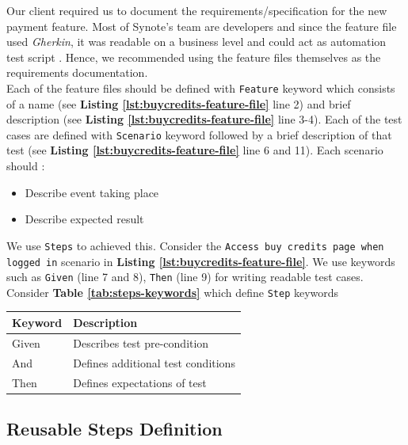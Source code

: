Our client required us to document the requirements/specification for the new payment feature. Most of Synote's team are developers and since the feature file used \textit{Gherkin}, it was readable on a business level and could act as automation test script \cite{featurefile1}. Hence, we recommended using the feature files themselves as the requirements documentation.\\

Each of the feature files should be defined with \texttt{Feature} keyword which consists of a name  (see \textbf{Listing \ref{lst:buycredits-feature-file}} line  2) and brief description  (see \textbf{Listing \ref{lst:buycredits-feature-file}} line  3-4). Each of the test cases are defined with \texttt{Scenario} keyword followed by a brief description of that test (see \textbf{Listing \ref{lst:buycredits-feature-file}} line  6 and 11). Each scenario should \cite{featurefile3}:
\begin{itemize}
\item Describe event taking place
\item Describe expected result
\end{itemize}

We use \texttt{Steps} to achieved this. Consider the \texttt{Access buy credits page when logged in} scenario in \textbf{Listing \ref{lst:buycredits-feature-file}}. We use keywords such as \texttt{Given} (line 7 and 8), \texttt{Then} (line 9) for writing readable test cases. Consider \textbf{Table \ref{tab:steps-keywords}} which define \texttt{Step} keywords \cite{featurefile1}

\begin{center}
\begin{tabular}{ |p{2cm}|p{7cm}| }

 \hline
 	Keyword &
 	Description\\
 \hline
 	Given & Describes test pre-condition\\
 \hline
 	And & Defines additional test conditions\\
 \hline
 	Then & Defines expectations of test \\
 \hline

\end{tabular}
\label{tab:steps-keywords}
\end{center}

\subsection{Reusable Steps Definition}
\label{subsec:reusable-steps-definition}

